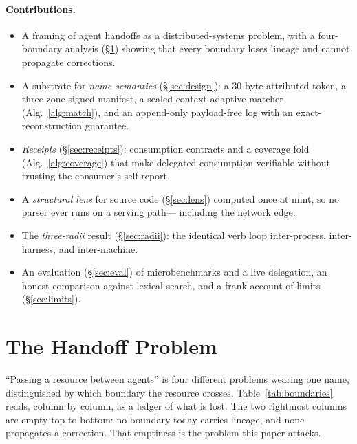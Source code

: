 \documentclass[10pt,twocolumn]{article}
\begin{document}
\paragraph{Contributions.}
\begin{itemize}
  \item A framing of agent handoffs as a distributed-systems problem, with
    a four-boundary analysis (\S\ref{sec:problem}) showing that every
    boundary loses lineage and cannot propagate corrections.
  \item A substrate for \emph{name semantics} (\S\ref{sec:design}): a
    30-byte attributed token, a three-zone signed manifest, a sealed
    context-adaptive matcher (Alg.~\ref{alg:match}), and an append-only
    payload-free log with an exact-reconstruction guarantee.
  \item \emph{Receipts} (\S\ref{sec:receipts}): consumption contracts and
    a coverage fold (Alg.~\ref{alg:coverage}) that make delegated
    consumption verifiable without trusting the consumer's self-report.
  \item A \emph{structural lens} for source code (\S\ref{sec:lens})
    computed once at mint, so no parser ever runs on a serving path---%
    including the network edge.
  \item The \emph{three-radii} result (\S\ref{sec:radii}): the identical
    verb loop inter-process, inter-harness, and inter-machine.
  \item An evaluation (\S\ref{sec:eval}) of microbenchmarks and a live
    delegation, an honest comparison against lexical search, and a frank
    account of limits (\S\ref{sec:limits}).
\end{itemize}

\section{The Handoff Problem}
\label{sec:problem}

``Passing a resource between agents'' is four different problems wearing
one name, distinguished by which boundary the resource crosses.
Table~\ref{tab:boundaries} reads, column by column, as a ledger of what is
lost. The two rightmost columns are empty top to bottom: no boundary today
carries lineage, and none propagates a correction. That emptiness is the
problem this paper attacks.
\end{document}
